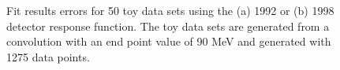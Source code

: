 
\begin{figure}[h]
  \centering
  \hfill
  \caption{Fit results errors for 50 toy data sets using the (a) 1992 or (b) 1998 detector response function.
    The toy data sets are generated from a convolution with an end point value of 90 MeV and generated
    with 1275 data points.
  }
  \label{fig:ToyFitErrs}
\end{figure}


